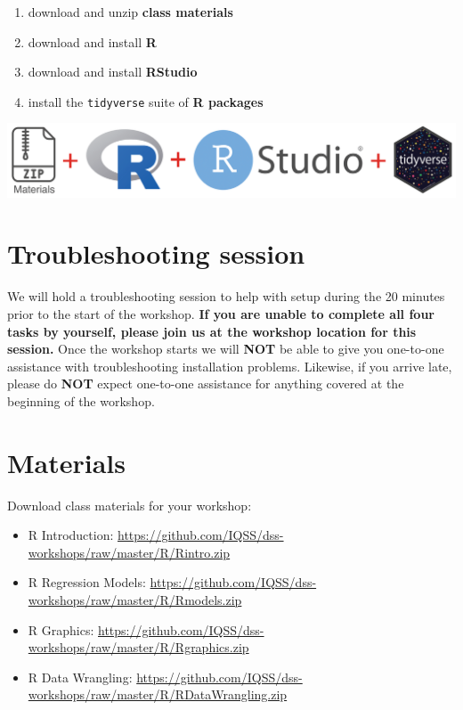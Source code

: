\documentclass[
]{book}
\providecommand{\tightlist}{%
  \setlength{\itemsep}{0pt}\setlength{\parskip}{0pt}}
\begin{document}
\begin{enumerate}
\def\labelenumi{\arabic{enumi}.}
\tightlist
\item
  download and unzip \textbf{class materials}
\item
  download and install \textbf{R}
\item
  download and install \textbf{RStudio}
\item
  install the \texttt{tidyverse} suite of \textbf{R packages}
\end{enumerate}

\includegraphics{R/Rinstall/images/install_software_R.png}

\hypertarget{troubleshooting-session}{%
\section{Troubleshooting session}\label{troubleshooting-session}}

We will hold a troubleshooting session to help with setup during the 20 minutes prior to the start of the workshop.
\textbf{If you are unable to complete all four tasks by yourself, please join us at the workshop location for this session.}
Once the workshop starts we will \textbf{NOT} be able to give you one-to-one assistance with troubleshooting installation problems. Likewise, if you arrive late, please do \textbf{NOT} expect one-to-one assistance for anything covered at the beginning of the workshop.

\hypertarget{materials}{%
\section{Materials}\label{materials}}

Download class materials for your workshop:

\begin{itemize}
\tightlist
\item
  R Introduction: \url{https://github.com/IQSS/dss-workshops/raw/master/R/Rintro.zip}
\item
  R Regression Models: \url{https://github.com/IQSS/dss-workshops/raw/master/R/Rmodels.zip}
\item
  R Graphics: \url{https://github.com/IQSS/dss-workshops/raw/master/R/Rgraphics.zip}
\item
  R Data Wrangling: \url{https://github.com/IQSS/dss-workshops/raw/master/R/RDataWrangling.zip}
\end{itemize}
\end{document}
